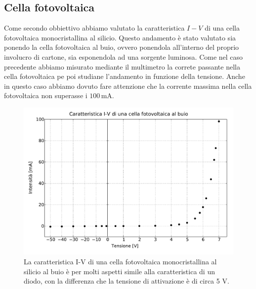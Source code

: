 \subsection{Cella fotovoltaica}

Come secondo obbiettivo abbiamo valutato la caratteristica $I-V$ di una cella fotovoltaica monocristallina al silicio. Questo andamento è stato valutato sia ponendo la cella fotovoltaica al buio, ovvero ponendola all'interno del proprio involucro di cartone, sia esponendola ad una sorgente luminosa.
Come nel caso precedente abbiamo misurato mediante il multimetro la correte passante nella cella fotovoltaica pe poi studiane l'andamento in funzione della tensione.
Anche in questo caso abbiamo dovuto fare attenzione che la corrente massima nella cella fotovoltaica non superasse i $100\,\si{\milli\ampere}$.

\begin{figure}
    \includegraphics[scale=0.5]{buio.pdf}
    \caption{La caratteristica I-V di una cella fotovoltaica monocristallina al silicio al buio è per molti aspetti simile alla caratteristica di un diodo, con la differenza che la tensione di attivazione è di circa 5 V.}
    \label{fig:buio}
\end{figure}

